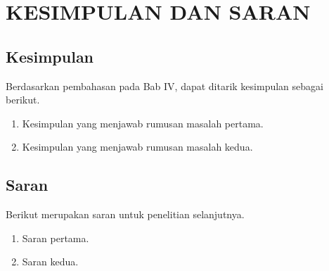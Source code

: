 \chapter{KESIMPULAN DAN SARAN}

\section{Kesimpulan}
Berdasarkan pembahasan pada Bab IV, dapat ditarik kesimpulan sebagai berikut.
\begin{enumerate}
  \item Kesimpulan yang menjawab rumusan masalah pertama.
  \item Kesimpulan yang menjawab rumusan masalah kedua.
\end{enumerate}

\section{Saran}
Berikut merupakan saran untuk penelitian selanjutnya.
\begin{enumerate}
  \item Saran pertama.
  \item Saran kedua.
\end{enumerate}
